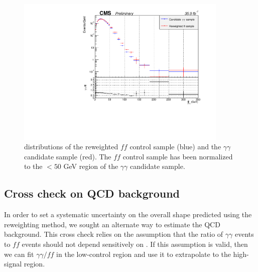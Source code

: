 \begin{figure}[h]
\begin{center}
\includegraphics[width=0.9\textwidth]{Figures/DataAnalysis/ggffReweighted.pdf}
\end{center}
\caption{\ETmiss distributions of the \diempt reweighted $ff$ control sample (blue) and the $\gamma\gamma$ candidate sample (red). The $ff$ control sample has been normalized to the \ETmiss $ < 50$ GeV region of the $\gamma\gamma$ candidate sample. }
\label{fig:ggffReweighted}
\end{figure}


\subsection{Cross check on QCD background}
\label{sec:crossCheck}

In order to set a systematic uncertainty on the overall \ETmiss shape predicted using the \diempt reweighting method, we sought an alternate way to estimate the QCD background. This cross check relies on the assumption that the ratio of $\gamma\gamma$ events to $ff$ events should not depend sensitively on \ETmiss. If this assumption is valid, then we can fit $\gamma\gamma/ff$ in the low-\ETmiss control region and use it to extrapolate to the high-\ETmiss signal region.

